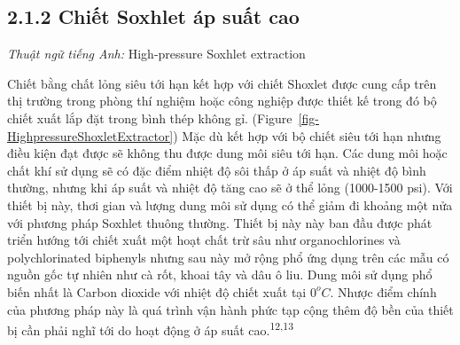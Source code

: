 \documentclass[
  twocolumn,
  landscape]{report}
\begin{document}
\subsection{2.1.2 Chiết Soxhlet áp suất
cao}\label{chiux1ebft-soxhlet-uxe1p-suux1ea5t-cao}

\emph{Thuật ngữ tiếng Anh:} High-pressure Soxhlet extraction

Chiết bằng chất lỏng siêu tới hạn kết hợp với chiết Shoxlet được cung
cấp trên thị trường trong phòng thí nghiệm hoặc công nghiệp được thiết
kế trong đó bộ chiết xuất lắp đặt trong bình thép không gỉ.
(Figure~\ref{fig-HighpressureShoxletExtractor}) Mặc dù kết hợp với bộ
chiết siêu tới hạn nhưng điều kiện đạt được sẽ không thu được dung môi
siêu tới hạn. Các dung môi hoặc chất khí sử dụng sẽ có đặc điểm nhiệt độ
sôi thấp ở áp suất và nhiệt độ bình thường, nhưng khi áp suất và nhiệt
độ tăng cao sẽ ở thể lỏng (1000-1500 psi). Với thiết bị này, thơi gian
và lượng dung môi sử dụng có thể giảm đi khoảng một nửa với phương pháp
Soxhlet thuông thường. Thiết bị này này ban đầu được phát triển hướng
tới chiết xuất một hoạt chất trừ sâu như organochlorines và
polychlorinated biphenyls nhưng sau này mở rộng phổ ứng dụng trên các
mẫu có nguồn gốc tự nhiên như cà rốt, khoai tây và dâu ô liu. Dung môi
sử dụng phổ biến nhất là Carbon dioxide với nhiệt độ chiết xuất tại
\(0^oC\). Nhược điểm chính của phương pháp này là quá trình vận hành
phức tạp cộng thêm độ bền của thiết bị cần phải nghĩ tới do hoạt động ở
áp suất cao.\textsuperscript{12,13}
\end{document}
